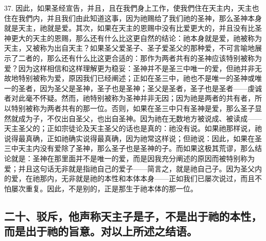 37. 因此，如果圣经宣告，并且，且在我們身上工作，使我們住在天主内，天主也住在我們内，并且我们由此知道这事，因为祂赐给了我们祂的圣神，那么圣神本身就是天主，祂就是爱。其次，如果在天主的恩赐中没有比爱更大的，并且没有比圣神更大的天主的恩赐，那么还有什么比这更自然的结论：祂本身就是爱，祂被称为天主，又被称为出自天主？如果圣父爱圣子、圣子爱圣父的那种爱，不可言喻地展示了二者的，那么还有什么比这更合适的：那作为两者共有的圣神应该特别被称为爱？因为这样相信和这样理解更为稳妥：圣神并不是圣三中唯一的爱，但祂并非无故地特别被称为爱，原因我们已经阐述；正如在圣三中，祂也不是唯一的圣神或唯一的圣者，因为圣父是圣神，圣子也是圣神；圣父是圣者，圣子也是圣者——虔诚者对此毫不怀疑。然而，祂特别被称为圣神并非无因；因为祂是两者的共有者，所以特别被称为两者共有的那一位。否则，如果在圣三中只有圣神是爱，那么圣子显然就成为子，不仅出自圣父，也出自圣神。因为祂在无数地方被说成、被读成——天主圣父的；正如宗徒论及天主圣父的话也是真的：祂没有说。如果祂那样说，祂说得最真确，正如祂确实说得最真确，因为祂常这样说；但祂说：因此，如果在圣三中天主内没有爱除了圣神，那么圣子也是圣神的子。而如果这极其荒谬，那么结论就是：圣神在那里面并不是唯一的爱，而是因我充分阐述的原因而被特别称为爱；并且这句话无非就是指祂自己的爱子——简言之，就是祂自己子。因为圣父内的爱，在祂那内，无非就是祂的本性和本体本身——正如我们已屡次说过，而且不怕屡次重复。因此，不是别的，正是那生于祂本体的那一位。\par


\subsection{二十、驳斥，他声称天主子是子，不是出于祂的本性，而是出于祂的旨意。对以上所述之结语。}

